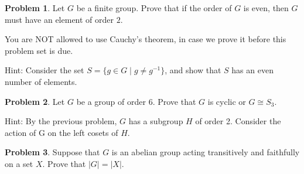 \documentclass[11pt]{article}
\theoremstyle{definition}
\newtheorem{problem}{Problem}
\begin{document}
\begin{problem}
Let $G$ be a finite group. Prove that if the order of $G$ is even, then $G$ must have an element of order $2$.

\vspace{0.3em}

\noindent
You are NOT allowed to use Cauchy's theorem, in case we prove it before this problem set is due.

\noindent
Hint: Consider the set $S=\{g\in G\mid g\neq g^{-1}\}$, and show that $S$ has an even number of elements.
\end{problem}


\begin{problem}
Let $G$ be a group of order $6$. Prove that $G$ is cyclic or $G\cong S_3$. 


\noindent
Hint:  By the previous problem, $G$ has a subgroup $H$ of order 2.  Consider the action of G on the left cosets of $H$.
\end{problem}



\begin{problem}
Suppose that $G$ is an abelian group acting transitively and faithfully on a set $X$.  Prove that $|G|=|X|$.
\end{problem}
\end{document}
